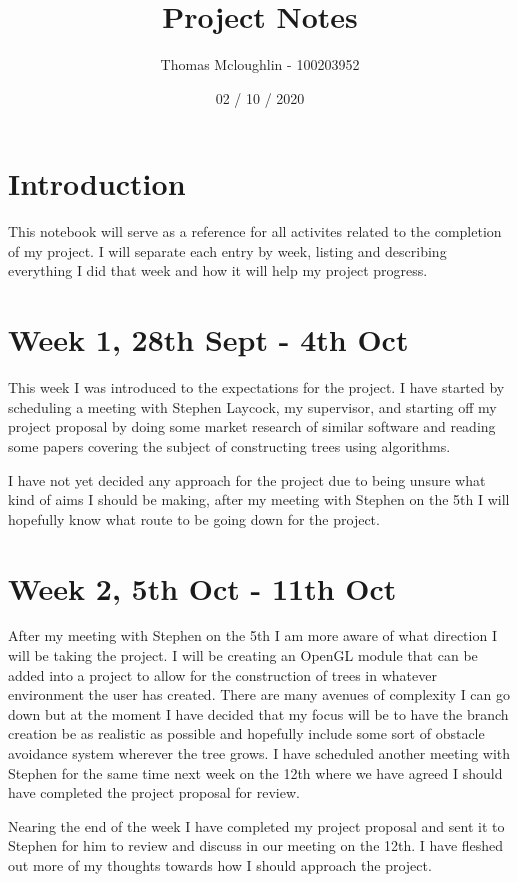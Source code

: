 \documentclass[12pt]{article}
\title{Project Notes}
\author{Thomas Mcloughlin - 100203952}
\date{02 / 10 / 2020}
\begin{document}
\maketitle

\pagebreak
\section*{Introduction}
This notebook will serve as a reference for all activites related to the completion
of my project. I will separate each entry by week, listing and describing everything
I did that week and how it will help my project progress.

\section*{Week 1, 28th Sept - 4th Oct}
This week I was introduced to the expectations for the project. I have started by 
scheduling a meeting with Stephen Laycock, my supervisor, and starting off my project 
proposal by doing some market research of similar software and reading some papers 
covering the subject of constructing trees using algorithms. \par
I have not yet decided any approach for the project due to being unsure what kind of 
aims I should be making, after my meeting with Stephen on the 5th I will hopefully 
know what route to be going down for the project.

\section*{Week 2, 5th Oct - 11th Oct}
After my meeting with Stephen on the 5th I am more aware of what direction I will be 
taking the project. I will be creating an OpenGL module that can be added into a 
project to allow for the construction of trees in whatever environment the user has 
created. There are many avenues of complexity I can go down but at the moment I have 
decided that my focus will be to have the branch creation be as realistic as possible 
and hopefully include some sort of obstacle avoidance system wherever the tree grows.
I have scheduled another meeting with Stephen for the same time next week on the 12th 
where we have agreed I should have completed the project proposal for review. \par
Nearing the end of the week I have completed my project proposal and sent it to 
Stephen for him to review and discuss in our meeting on the 12th. I have fleshed out 
more of my thoughts towards how I should approach the project.
\end{document}

